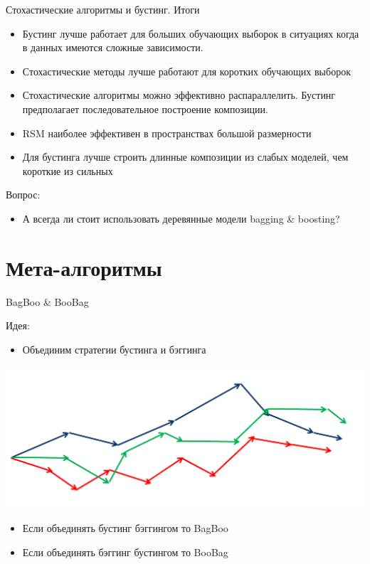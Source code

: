 \documentclass[10pt]{beamer}
\begin{document}
\begin{frame}{Стохастические алгоритмы и бустинг. Итоги}
\begin{itemize}
    \item[\color{green}\ding{52}] Бустинг лучше работает для больших обучающих
    выборок в ситуациях когда в данных имеются сложные зависимости.
    \item[\color{green}\ding{52}] Стохастические методы лучше работают для коротких
    обучающих выборок
    \item[\color{green}\ding{52}] Стохастические алгоритмы можно эффективно
    распараллелить. Бустинг предполагает последовательное построение
    композиции.
    \item[\color{green}\ding{52}] RSM наиболее эффективен в пространствах большой
    размерности
    \item[\color{green}\ding{52}] Для бустинга лучше строить длинные композиции из
    слабых моделей, чем короткие из сильных
\end{itemize}

\begin{block}{Вопрос:}
\end{block}
\begin{itemize}
    \item А всегда ли стоит использовать деревянные модели bagging \& boosting?
\end{itemize}
\end{frame}

\section{Мета-алгоритмы}

\begin{frame}{BagBoo \& BooBag}
\begin{block}{Идея:}
\end{block}
\begin{itemize}
    \item Объединим стратегии бустинга и бэггинга
\end{itemize}
\begin{center}
    \includegraphics[scale=0.25]{images/bagboo.png}
\end{center}
\begin{itemize}
    \item Если объединять бустинг бэггингом то BagBoo
    \item Если объединять бэггинг бустингом то BooBag
\end{itemize}
\end{frame}
\end{document}
